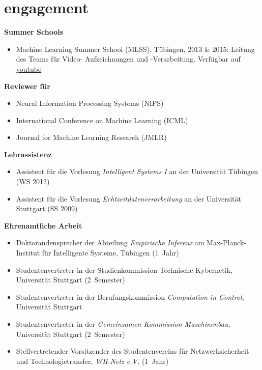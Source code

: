 \documentclass[a4paper]{k-cv} %
\begin{document}
{\raggedright
\section{engagement} \bodyfont
{\Large \bfseries Summer Schools}
\begin{itemize}
 \item Machine Learning Summer School (MLSS), T\"ubingen, 2013 \& 2015: Leitung 
des Teams für Video- Aufzeichnungen und -Verarbeitung.
Verfügbar auf \href{
https://www.youtube.com/playlist?list=PLqJm7Rc5-EXFv6RXaPZzzlzo93Hl0v91E } {\to
youtube}
\end{itemize}

{\Large \bfseries Reviewer für}
\begin{itemize}
 \item Neural Information Processing Systems (NIPS)
 \item International Conference on Machine Learning (ICML)
 \item Journal for Machine Learning Research (JMLR)
\end{itemize}

{\Large \bfseries Lehrassistenz}
\begin{itemize}
 \item Assistent für die Vorlesung \emph{Intelligent Systems I} an der 
Universität T\"ubingen (WS 2012)
\item Assistent für die Vorlesung \emph{Echtzeitdatenverarbeitung} an der 
Universität Stuttgart (SS 2009)
\end{itemize}


{\Large \bfseries Ehrenamtliche Arbeit}
\begin{itemize}
 \item Doktorandensprecher der Abteilung \emph{Empirische Inferenz} am
Max-Planck-Institut für Intelligente Systeme, T\"ubingen (1~Jahr)
 \item Studentenvertreter in der Studienkommission Technische 
Kybernetik, Universität Stuttgart (2~Semester)
\item Studentenvertreter in der Berufungskommission \emph{Computation in
Control}, Universität Stuttgart
\item Studentenvertreter in der \emph{Gemeinsamen Kommission Maschinenbau},
Universität Stuttgart (2~Semester)
 \item Stellvertretender Vorsitzender des Studentenvereins für 
Netzwerksicherheit und Technologietransfer, \emph{WH-Netz e.V.} (1~Jahr)
\end{itemize}
}

\end{document}
